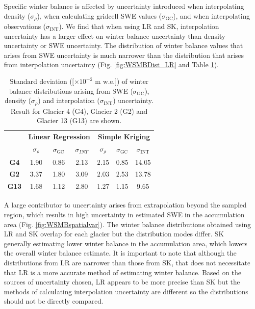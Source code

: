 \documentclass[twocolumn, letterpaper]{igs}
\begin{document}
Specific winter balance is affected by uncertainty introduced when interpolating density ($\sigma_{\rho}$), when calculating gridcell SWE values ($\sigma_{\mathrm{GC}}$), and when interpolating observations ($\sigma_{\mathrm{INT}}$). We find that when using LR and SK, interpolation uncertainty has a larger effect on winter balance uncertainty than density uncertainty or SWE uncertainty. The distribution of winter balance values that arises from SWE uncertainty is much narrower than the distribution that arises from interpolation uncertainty (Fig. \ref{fig:WSMBDist_LR} and Table \ref{tab:WSMBdistribution_sigma}).

 \begin{table}[]
\centering
\caption{Standard deviation ([$\times10^{-2}$ m w.e.]) of winter balance distributions arising from SWE ($\sigma_{\mathrm{GC}}$), density ($\sigma_{\rho}$) and interpolation ($\sigma_{\mathrm{INT}}$) uncertainty. Result for Glacier 4 (G4), Glacier 2 (G2) and Glacier 13 (G13) are shown.}
\label{tab:WSMBdistribution_sigma}
\begin{tabular}{ccccccc}
\textbf{} & \multicolumn{3}{c}{\textbf{Linear Regression}} & \multicolumn{3}{c}{\textbf{Simple Kriging}} \\
 & $\sigma_{\rho}$ & $\sigma_{\mathrm{GC}}$ & $\sigma_{INT}$ & $\sigma_{\rho}$ & $\sigma_{\mathrm{GC}}$ & $\sigma_{\mathrm{INT}}$ \\
\midrule
\textbf{G4} & 1.90 & 0.86 & 2.13 & 2.15 & 0.85 & 14.05 \\
\textbf{G2} &3.37 & 1.80 & 3.09 & 2.03 & 2.53 & 13.78 \\
\textbf{G13} & 1.68 & 1.12 & 2.80 & 1.27 & 1.15 & 9.65
\end{tabular}
\end{table}



A large contributor to uncertainty arises from extrapolation beyond the sampled region, which results in high uncertainty in estimated SWE in the accumulation area (Fig. \ref{fig:WSMBspatialvar}). The winter balance distributions obtained using LR and SK overlap for each glacier but the distribution modes differ. SK generally estimating lower winter balance in the accumulation area, which lowers the overall winter balance estimate. It is important to note that although the distributions from LR are narrower than those from SK, that does not necessitate that LR is a more accurate method of estimating winter balance. Based on the sources of uncertainty chosen, LR appears to be more precise than SK but the methods of calculating interpolation uncertainty are different so the distributions should not be directly compared.
\end{document}
